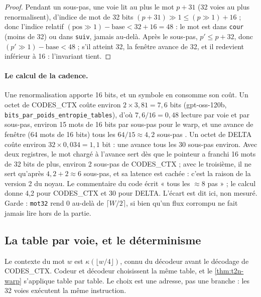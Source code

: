 \begin{proof}
Pendant un sous-pas, une voie lit au plus le mot $p + 31$ (32 voies au plus renormalisent), d'indice de mot de 32 bits $(p + 31) \gg 1 \le (p \gg 1) + 16$ ; donc l'indice relatif $(\mathrm{pos} \gg 1) - \mathrm{base} < 32 + 16 = 48$ : le mot est dans \texttt{cour} (moins de 32) ou dans \texttt{suiv}, jamais au-delà. Après le sous-pas, $p' \le p + 32$, donc $(p' \gg 1) - \mathrm{base} < 48$ ; s'il atteint 32, la fenêtre avance de 32, et il redevient inférieur à 16 : l'invariant tient.
\end{proof}

\paragraph{Le calcul de la cadence.} Une renormalisation apporte 16 bits, et un symbole en consomme son coût. Un octet de CODES\_CTX coûte environ $2 \times 3{,}81 = 7{,}6$ bits (gpt-oss-120b, \texttt{bits\_\allowbreak par\_\allowbreak poids\_\allowbreak entropie\_\allowbreak tables}), d'où $7{,}6/16 = 0{,}48$ lecture par voie et par sous-pas, environ 15 mots de 16 bits par sous-pas pour le warp, et une avance de fenêtre (64 mots de 16 bits) tous les $64/15 \approx 4{,}2$ sous-pas \calc. Un octet de DELTA coûte environ $32 \times 0{,}034 = 1{,}1$ bit : une avance tous les 30 sous-pas environ. Avec deux registres, le mot chargé à l'avance sert dès que le pointeur a franchi 16 mots de 32 bits de plus, environ 2 sous-pas de CODES\_CTX ; avec le troisième, il ne sert qu'après $4{,}2 + 2 \approx 6$ sous-pas, et sa latence est cachée : c'est la raison de la version 2 du noyau. Le commentaire du code écrit « tous les $\approx 8$ pas » ; le calcul donne 4,2 pour CODES\_CTX et 30 pour DELTA. L'écart est dit ici, non mesuré. Garde : \texttt{mot32} rend 0 au-delà de $\lceil W/2 \rceil$, si bien qu'un flux corrompu ne fait jamais lire hors de la partie.

\subsection{La table par voie, et le déterminisme}

\begin{proposition}\label{prop:t2n-table-voie}
Le contexte du mot $w$ est $\kappa(\lfloor w/4 \rfloor)$, connu du décodeur avant le décodage de CODES\_CTX. Codeur et décodeur choisissent la même table, et le \cref{thm:t2n-warp} s'applique table par table. Le choix est une adresse, pas une branche : les 32 voies exécutent la même instruction.
\end{proposition}

